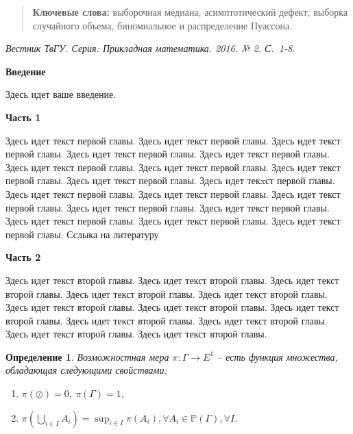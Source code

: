 \documentclass[a4paper,twoside]{article}
\newcommand{\firstheader}[1]{\noindent\textbf{#1}\nopagebreak\bigskip}
\newcommand{\header}[1]{\bigskip\medskip\noindent\textbf{#1}\nopagebreak\bigskip}
\theoremstyle{theorem}
\newtheorem{definition}{Определение}
\theoremstyle{remark}
\newcommand{\pages}{1-8}
\begin{document}
\begin{quote}
{\bf Ключевые слова:} выборочная медиана, асимптотический дефект, выборка случайного объема, биномиальное и распределение Пуассона.
\end{quote}
{\small {\it Вестник ТвГУ. Серия: Прикладная математика. 2016. № 2. С.~\pages.}}
\vspace{5mm}



\firstheader{Введение}

Здесь идет ваше введение.

\header{Часть 1}

Здесь идет текст первой главы. Здесь идет текст первой главы. Здесь идет текст первой главы. 
Здесь идет текст первой главы. Здесь идет текст первой главы. Здесь идет текст первой главы. 
Здесь идет текст первой главы. Здесь идет текст первой главы. Здесь идет текст первой главы. 
Здесь идет текxст первой главы. Здесь идет текст первой главы. Здесь идет текст первой главы. 
Здесь идет текст первой главы. Здесь идет текст первой главы. Здесь идет текст первой главы. 
Здесь идет текст первой главы. Здесь идет текст первой главы. Здесь идет текст первой главы. 
Сслыка на литературу \cite{author:ref1}


\header{Часть 2}

Здесь идет текст второй главы. Здесь идет текст второй главы. Здесь идет текст второй главы.
Здесь идет текст второй главы. Здесь идет текст второй главы. Здесь идет текст второй главы.
Здесь идет текст второй главы. Здесь идет текст второй главы. Здесь идет текст второй главы.
Здесь идет текст второй главы. Здесь идет текст второй главы. Здесь идет текст второй главы.
\begin{definition}
Возможностная мера $\pi:\Gamma\rightarrow E^1$ -- есть функция множества, обладающая следующими свойствами:
\begin{enumerate}
\item $\pi(\oslash) = 0$, $\pi(\Gamma) = 1$,
\item $\displaystyle\pi\left(\bigcup_{i\in I}A_i\right) = \sup_{i\in I}\pi(A_i), \forall A_i\in {\mathbb P}(\Gamma), \forall I$.
\end{enumerate}
\end{definition}
\end{document}
